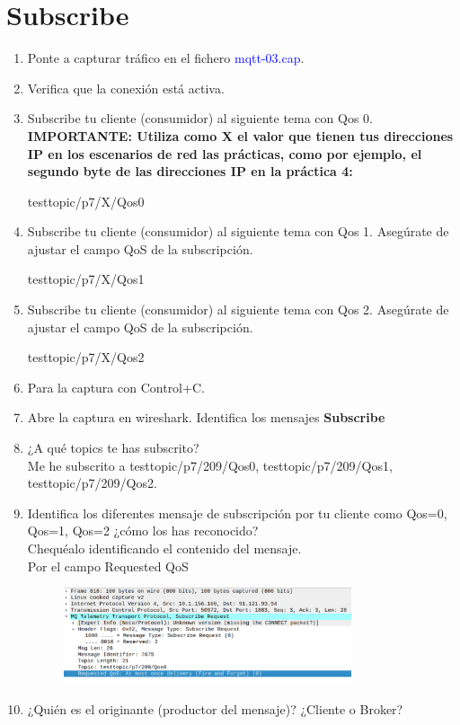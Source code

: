 \documentclass[12pt, a4paper]{report}
\begin{document}
\chapter{Subscribe}
\begin{enumerate}
	\item Ponte a capturar tráfico en el fichero \textcolor{blue}{mqtt-03.cap}.
	\item Verifica que la conexión está activa.
	\item Subscribe tu cliente (consumidor) al siguiente tema con Qos 0.\\
	\textbf{IMPORTANTE: Utiliza como X el valor que tienen tus direcciones IP en los escenarios de red las prácticas, como por ejemplo, el segundo byte de las direcciones IP
		en la práctica 4:}
	\begin{center}
		testtopic/p7/X/Qos0
	\end{center}
	\item Subscribe tu cliente (consumidor) al siguiente tema con Qos 1. Asegúrate de ajustar el campo
	QoS de la subscripción.
	\begin{center}
		testtopic/p7/X/Qos1
	\end{center}
	\item Subscribe tu cliente (consumidor) al siguiente tema con Qos 2. Asegúrate de ajustar el campo
	QoS de la subscripción.
	\begin{center}
		testtopic/p7/X/Qos2
	\end{center}
	\item Para la captura con Control+C.
	\item Abre la captura en wireshark. Identifica los mensajes \textbf{Subscribe}
	\item ¿A qué topics te has subscrito?\\
	
	Me he subscrito a testtopic/p7/209/Qos0, testtopic/p7/209/Qos1, testtopic/p7/209/Qos2.
	\item Identifica los diferentes mensaje de subscripción por tu cliente como Qos=0, Qos=1, Qos=2
	¿cómo los has reconocido?\\
	Chequéalo identificando el contenido del mensaje.\\
	
	Por el campo Requested QoS
	\begin{figure}[H]
		\centering
		\includegraphics[width=0.8\textwidth]{ej6.9}
	\end{figure}
	\item ¿Quién es el originante (productor del mensaje)? ¿Cliente o Broker?\\
	

\end{enumerate}
\end{document}
